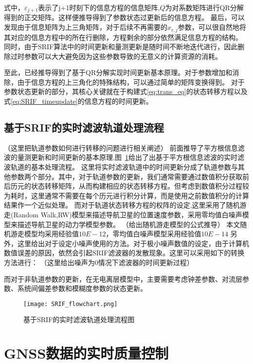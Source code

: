 式中，\(\varepsilon_{j+1}\)表示了j+1时刻下的信息方程的信息矩阵,\(Q\)为对系数矩阵进行QR分解得到的正交矩阵。这样便推导得到了参数状态过更新后的信息方程。
最后，可以发现由于信息矩阵为上三角矩阵，对于后续不再需要的\(x_{r,j}\)参数，可以很自然地将其对应的信息方程中的所在行删除，方程剩余的部分依然满足信息方程的结构。
同时，由于SRIF算法中的时间更新和量测更新是随时间不断地迭代进行，因此删除过时参数可以大大避免因为这些参数导致的无意义的计算资源的消耗。

至此，已经推导得到了基于QR分解实现时间更新基本原理。对于参数增加和消除，由于信息方程的上三角化的特殊结构，可以通过简单的矩阵变换得到。
对于参数状态更新的部分，其核心关键就在于构建式\eqref{eq:trans_eq}的状态转移方程以及式\eqref{eq:SRIF_timeupdate}的信息方程的时间更新。

\subsection{基于SRIF的实时滤波轨道处理流程}

（这里把轨道参数如何进行转移的问题进行相关阐述）
前面推导了平方根信息滤波的量测更新和时间更新的基本原理,图~\ref{fig:SRIF_flowchart}给出了出基于平方根信息滤波的实时滤波轨道的基本处理流程。
这里将实时滤波轨道中的时间更新分成了轨道参数与其他参数两个部分。其中，对于轨道参数的更新，我们通常需要通过数值积分获取前后历元的状态转移矩阵，从而构建相应的状态转移方程。但考虑到数值积分过程较为耗时，这里通常不需要在每个历元进行积分计算，而是使用之前数值积分的计算结果作一个近似处理。
而对于轨道状态转移方程的权阵的设定,这里采用了随机游走(Random Walk,RW)模型来描述导航卫星的位置速度参数，采用零均值白噪声模型来描述导航卫星的动力学模型参数。
（给出随机游走模型的公式推导）
本文随机游走模型均采用经验值\(10E-12\)，零均值白噪声模型采用经验值\(10E-14\)
另外，这里给出对于设定小噪声使用的方法。对于极小噪声数值的设定，由于计算机数值误差的原因，依然会引起SRIF滤波器的发散现象。这里可以采用如下的转换方法进行：
（这里给出噪声为0情况下滤波器的时间更新过程）
\

而对于非轨道参数的更新，在无电离层模型中，主要需要考虑钟差参数、对流层参数、系统间偏差参数和模糊度参数的状态更新。

\begin{figure}
  \centering
  \texttt{[image: SRIF\_flowchart.png]}
  \caption{基于SRIF的实时滤波轨道处理流程图}
  \label{fig:SRIF_flowchart}
\end{figure}


\section{GNSS数据的实时质量控制}

